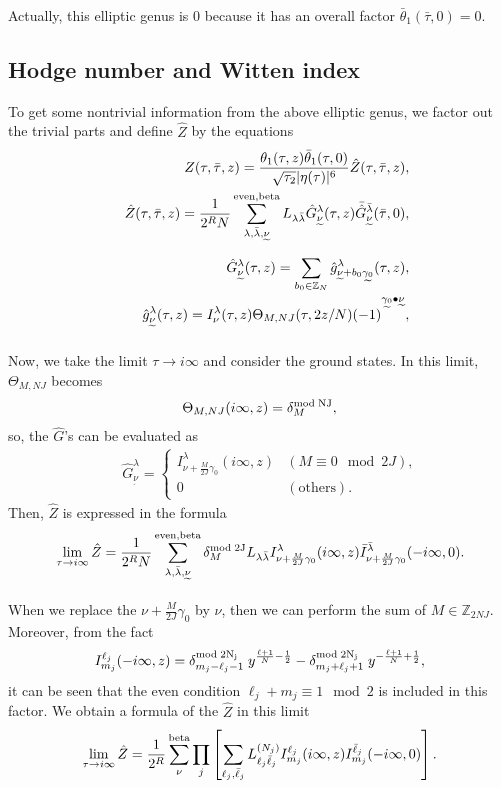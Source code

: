 \documentclass[a4paper,12pt]{article}
\numberwithin{equation}{section}
\newcommand{\deltam}[2]{\delta^{\rm mod\;#2}_{#1}}
\newcommand{\Th}{\Theta}
\newcommand{\Zb}{{\mathbb Z}}
\newcommand{\nt}{\underset{\widetilde{}}{\nu}}
\newcommand{\gt}{\underset{\widetilde{}}{\gamma_{0}}}
\newcommand{\taub}{\bar{\tau}}
\newcommand{\lambdab}{\bar{\lambda}}
\newcommand{\Zh}{\hat{Z}}
\newcommand{\Gh}{\hat{G}}
\newcommand{\gh}{\hat{g}}
\begin{document}
Actually, this elliptic genus is $0$ because it has an overall factor
$\bar\theta_1(\taub,0)=0$.
\subsection{Hodge number and Witten index}
To get some nontrivial information from the above elliptic genus,
we factor out the trivial parts and define $\Zh$ by the equations
\begin{eqnarray*}
 && Z(\tau,\taub,z)=
\frac{\theta_1(\tau,z)\bar\theta_1(\tau,0)}{\sqrt{\tau_2}|\eta(\tau)|^6}
\Zh(\tau,\taub,z),\\
 && \Zh(\tau,\taub,z)=\frac1{2^{R}N}
\sum_{\lambda,\lambdab,\nt}^{\rm even,beta}
L_{\lambda\lambdab}\Gh_{\nt}^{\lambda}(\tau,z)
\bar{\Gh}_{\nt}^{\lambdab}(\taub,0),\\
&& \Gh_{\nt}^{\lambda}(\tau,z)=\sum_{b_0\in \Zb_{N}}
\gh_{\nt+b_0\gt}^{\lambda}(\tau,z),\\
&& \gh_{\nt}^{\lambda}(\tau,z)=I_{\nu}^{\lambda}(\tau,z)
\Th_{M,NJ}(\tau,2z/N)(-1)^{\gt\bullet\nt},
\end{eqnarray*}

Now, we take the limit
$\tau\to i \infty$ and consider the ground states.
In this limit, $\Th_{M,NJ}$ becomes
\begin{eqnarray*}
 \Th_{M,NJ}(i\infty,z)=\deltam{M}{NJ},
\end{eqnarray*}
so, the $\Gh$'s can be evaluated as
\begin{eqnarray*}
 &&\Gh_{\nt}^{\lambda}=
\begin{cases}
I_{\nu+\frac{M}{2J}\gamma_0}^{\lambda}(i\infty,z)  & (M\equiv 0 \mod 2J), \\
0 & (\mbox{others}).
\end{cases}
\end{eqnarray*}
Then, $\Zh$ is expressed in the formula
\begin{eqnarray*}
 \lim_{\tau\to i \infty}\Zh=\frac1{2^{R}N}
\sum_{\lambda,\lambdab,\nt}^{\rm even,beta}\deltam{M}{2J}
L_{\lambda\lambdab}
I_{\nu+\frac{M}{2J}\gamma_0}^{\lambda}(i\infty,z)
\bar I_{\nu+\frac{M}{2J}\gamma_0}^{\lambdab}(-i\infty,0).
\end{eqnarray*}
When we replace the $\nu+\frac{M}{2J}\gamma_0$ by $\nu$, then we can
perform the sum of $M\in \Zb_{2NJ}$.
Moreover, from the fact
\begin{eqnarray*}
 I_{m_j}^{\ell_j}(-i\infty,z)
=\deltam{m_j-\ell_j-1}{2N_j}\;y^{\frac{\ell+1}{N}-\frac12}
-\deltam{m_j+\ell_j+1}{2N_j}\;y^{-\frac{\ell+1}{N}+\frac12},
\end{eqnarray*}
it can be seen that the even condition $\ell_j+m_j\equiv 1 \mod{2}$
is included in this factor.
We obtain a formula of the $\Zh$ in this limit
\begin{eqnarray*}
 \lim_{\tau\to i \infty}\Zh=\frac1{2^{R}}
\sum_{\nu}^{\rm beta}
\prod_j \left[
\sum_{\ell_j,\bar\ell_j}
L^{(N_j)}_{\ell_j\bar\ell_j}
I_{m_j}^{\ell_j}(i\infty,z)
I_{m_j}^{\bar\ell_j}(-i\infty,0)
\right]
.
\end{eqnarray*}
\end{document}

